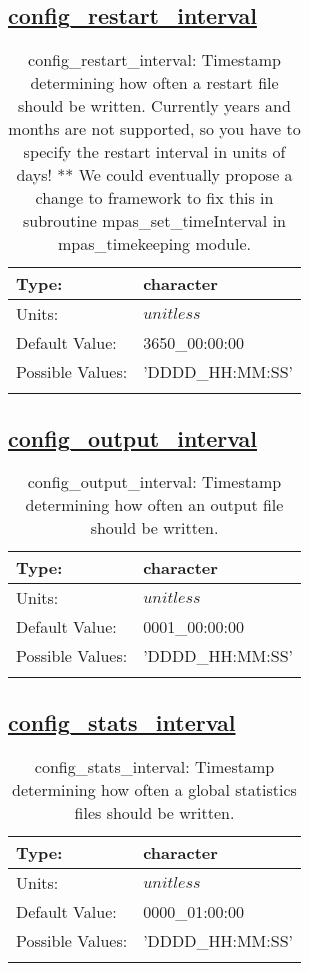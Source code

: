 \subsection[config\_restart\_interval]{\hyperref[sec:nm_tab_io]{config\_restart\_interval}}
\label{subsec:nm_sec_config_restart_interval}
\begin{center}
\begin{longtable}{| p{2.0in} | p{4.0in} |}
    \hline
    Type: & character \\
    \hline
    Units: & $unitless$ \\
    \hline
    Default Value: & 3650\_00:00:00 \\
    \hline
    Possible Values: & 'DDDD\_HH:MM:SS' \\
    \hline
    \caption{config\_restart\_interval: Timestamp determining how often a restart file should be written.  Currently years and months are not supported, so you have to specify the restart interval in units of days! **  We could eventually propose a change to framework to fix this in subroutine mpas\_set\_timeInterval in mpas\_timekeeping module.}
\end{longtable}
\end{center}
\subsection[config\_output\_interval]{\hyperref[sec:nm_tab_io]{config\_output\_interval}}
\label{subsec:nm_sec_config_output_interval}
\begin{center}
\begin{longtable}{| p{2.0in} | p{4.0in} |}
    \hline
    Type: & character \\
    \hline
    Units: & $unitless$ \\
    \hline
    Default Value: & 0001\_00:00:00 \\
    \hline
    Possible Values: & 'DDDD\_HH:MM:SS' \\
    \hline
    \caption{config\_output\_interval: Timestamp determining how often an output file should be written.}
\end{longtable}
\end{center}
\subsection[config\_stats\_interval]{\hyperref[sec:nm_tab_io]{config\_stats\_interval}}
\label{subsec:nm_sec_config_stats_interval}
\begin{center}
\begin{longtable}{| p{2.0in} | p{4.0in} |}
    \hline
    Type: & character \\
    \hline
    Units: & $unitless$ \\
    \hline
    Default Value: & 0000\_01:00:00 \\
    \hline
    Possible Values: & 'DDDD\_HH:MM:SS' \\
    \hline
    \caption{config\_stats\_interval: Timestamp determining how often a global statistics files should be written.}
\end{longtable}
\end{center}

